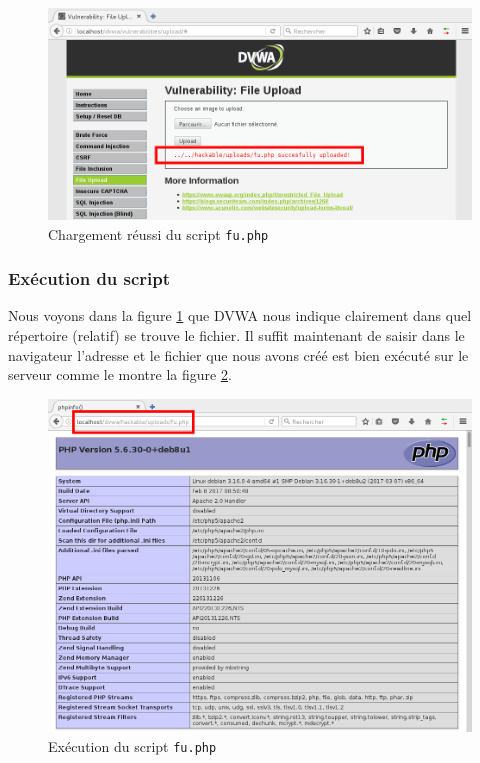 \begin{figure}[!h]
\begin{center}
\includegraphics[scale=.45]{images/fu1.png}

\caption{Chargement réussi du script \texttt{fu.php}}
\label{fu_dvwa1}
\end{center}
\end{figure}


\subsubsection{Exécution du script}

Nous voyons dans la figure \ref{fu_dvwa1} que DVWA nous indique clairement dans quel répertoire (relatif) se trouve le fichier. Il suffit maintenant de saisir dans le navigateur l'adresse  et le fichier que nous avons créé est bien exécuté sur le serveur comme le montre la figure \ref{fu_dvwa2}.

\begin{figure}[!h]
\begin{center}
\includegraphics[scale=.45]{images/fu2.png}

\caption{Exécution du script \texttt{fu.php}}
\label{fu_dvwa2}
\end{center}
\end{figure}

